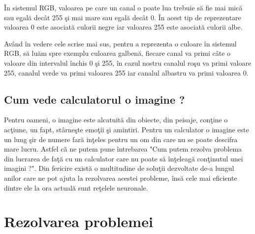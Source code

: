 \par

\^{I}n sistemul RGB, valoarea pe care un canal o poate lua trebuie s\u{a} fie mai mic\u{a} sau egal\u{a} dec\^{a}t 255 \c{s}i mai mare sau egal\u{a} dec\^{a}t 0. \^{I}n acest tip de reprezentare valoarea 0 este asociat\u{a} culorii negre iar valoarea 255 este asociat\u{a} culorii albe. 

\par

Av\^{a}nd \^{i}n vedere cele scrise mai sus, pentru a reprezenta o culoare \^{i}n sistemul RGB, s\u{a} lu\u{a}m spre exemplu culoarea galben\u{a}, fiecare canal va primi c\^{a}te o valoare din intervalul \^{i}nchis 0 \c{s}i 255, \^{i}n cazul nostru canalul ro\c{s}u va primi valoare 255, canalul verde va primi valoarea 255 iar canalul albastru va primi valoarea 0.

\subsection{Cum vede calculatorul o imagine ?}

Pentru oameni, o imagine este alcatuit\u{a} din obiecte, din peisaje, con\c{t}ine o ac\c{t}iune, un fapt, st\^{a}rne\c{s}te emo\c{t}ii \c{s}i amintiri. Pentru un calculator o imagine este un lung \c{s}ir de numere far\u{a} in\c{t}eles pentru un om din care nu se poate descifra mare lucru. Astfel c\u{a} ne putem pune \^{i}ntrebarea "Cum putem rezolva problema din lucrarea de fa\c{t}\u{a} cu un calculator care nu poate s\u{a} \^{i}n\c{t}eleag\u{a} con\c{t}inutul unei imagini ?". Din fericire exist\u{a} o multitudine de solu\c{t}ii dezvoltate de-a lungul anilor care ne pot ajuta la rezolvarea acestei probleme, \^{i}ns\u{a} cele mai eficiente dintre ele la ora actual\u{a} sunt re\c{t}elele neuronale.

\section{Rezolvarea problemei}

